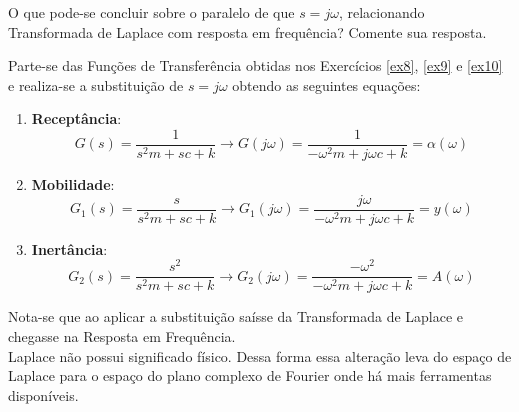 \documentclass{article}
\begin{document}
\newpage
\begin{exercise}\label{ex13}
    O que pode-se concluir sobre o paralelo de que $s = j\omega$, relacionando Transformada de Laplace com resposta em frequência? Comente sua resposta.
\end{exercise}
\begin{resolution}
    Parte-se das Funções de Transferência obtidas nos Exercícios \ref{ex8}, \ref{ex9} e \ref{ex10} e realiza-se a substituição de $s = j\omega$ obtendo as seguintes equações:
    \begin{enumerate}
        \item \textbf{Receptância}:
        \begin{equation}
            G(s) = \frac{1}{s^2m + sc + k} \to \boxed{G(j\omega) = \frac{1}{-\omega^2m + j\omega c + k} = \alpha(\omega)}
        \end{equation}

        \item \textbf{Mobilidade}:
        \begin{equation}
            G_1(s) = \frac{s}{s^2m + sc + k} \to \boxed{G_1(j\omega) = \frac{j\omega}{-\omega^2m + j\omega c + k} = y(\omega)}
        \end{equation}

        \item \textbf{Inertância}:
        \begin{equation}
            G_2(s) = \frac{s^2}{s^2m + sc + k} \to \boxed{G_2(j\omega) = \frac{-\omega^2}{-\omega^2m + j\omega c + k} = A(\omega)}
        \end{equation}
    \end{enumerate}
    Nota-se que ao aplicar a substituição saísse da Transformada de Laplace e chegasse na Resposta em Frequência.\\

    Laplace não possui significado físico. Dessa forma essa alteração leva do espaço de Laplace para o espaço do plano complexo de Fourier onde há mais ferramentas disponíveis.
\end{resolution}
\end{document}
